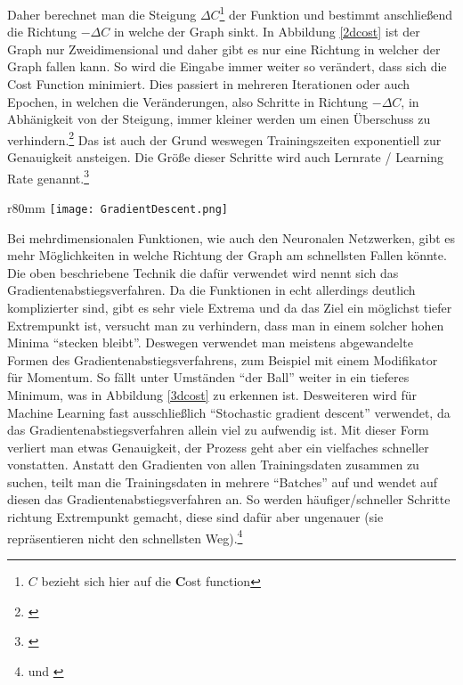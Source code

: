 Daher berechnet man die Steigung $\Delta C$\footnote{$C$ bezieht sich hier auf die \textbf{C}ost function} der Funktion und bestimmt anschließend die Richtung $-\Delta C$ in welche der Graph sinkt. In Abbildung \ref{2dcost} ist der Graph nur Zweidimensional und daher gibt es nur eine Richtung in welcher der Graph fallen kann. So wird die Eingabe immer weiter so verändert, dass sich die Cost Function minimiert. Dies passiert in mehreren Iterationen oder auch Epochen, in welchen die Veränderungen, also Schritte in Richtung $-\Delta C$, in Abhänigkeit von der Steigung, immer kleiner werden um einen Überschuss zu verhindern.\footnote{\cite{3blue1brown}} Das ist auch der Grund weswegen Trainingszeiten exponentiell zur Genauigkeit ansteigen. Die Größe dieser Schritte wird auch Lernrate / Learning Rate genannt.\footnote{\cite{readthedocsgradientdescent}}

\begin{wrapfigure}{r}{80mm}
    \texttt{[image: GradientDescent.png]}
    \caption[3dcost]{Visualisierung des Gradientenabstiegsverfahren im dreidimensionalen Raum \cite{3blue1brown})}
    \label{3dcost}
\end{wrapfigure}

Bei mehrdimensionalen Funktionen, wie auch den Neuronalen Netzwerken, gibt es mehr Möglichkeiten in welche Richtung der Graph am schnellsten Fallen könnte. Die oben beschriebene Technik die dafür verwendet wird nennt sich das Gradientenabstiegsverfahren. Da die Funktionen in echt allerdings deutlich komplizierter sind, gibt es sehr viele Extrema und da das Ziel ein möglichst tiefer Extrempunkt ist, versucht man zu verhindern, dass man in einem solcher hohen Minima "`stecken bleibt"'. Deswegen verwendet man meistens abgewandelte Formen des Gradientenabstiegsverfahrens, zum Beispiel mit einem Modifikator für Momentum. So fällt unter Umständen "`der Ball"' weiter in ein tieferes Minimum, was in Abbildung \ref{3dcost} zu erkennen ist. Desweiteren wird für Machine Learning fast ausschließlich "`Stochastic gradient descent"' verwendet, da das Gradientenabstiegsverfahren allein viel zu aufwendig ist. Mit dieser Form verliert man etwas Genauigkeit, der Prozess geht aber ein vielfaches schneller vonstatten. Anstatt den Gradienten von allen Trainingsdaten zusammen zu suchen, teilt man die Trainingsdaten in mehrere "`Batches"' auf und wendet auf diesen das Gradientenabstiegsverfahren an. So werden häufiger/schneller Schritte richtung Extrempunkt gemacht, diese sind dafür aber ungenauer (sie repräsentieren nicht den schnellsten Weg).\footnote{\cite{3blue1brown} und \cite{mitstochasticgd}}

